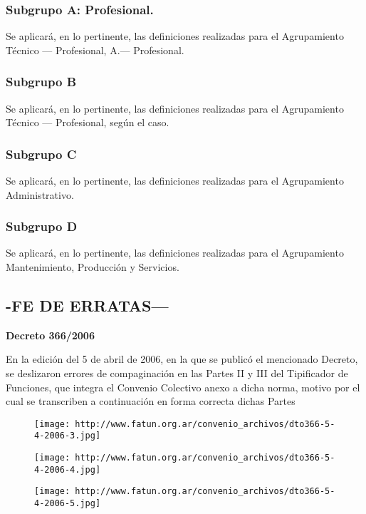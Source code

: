 \documentclass[]{article}
\begin{document}
\subsubsection{Subgrupo A: Profesional.}\label{subgrupo-a-profesional.}

Se aplicará, en lo pertinente, las definiciones realizadas para el
Agrupamiento Técnico --- Profesional, A.--- Profesional.

\subsubsection{Subgrupo B}\label{subgrupo-b}

Se aplicará, en lo pertinente, las definiciones realizadas para el
Agrupamiento Técnico --- Profesional, según el caso.

\subsubsection{Subgrupo C}\label{subgrupo-c}

Se aplicará, en lo pertinente, las definiciones realizadas para el
Agrupamiento Administrativo.

\subsubsection{Subgrupo D}\label{subgrupo-d}

Se aplicará, en lo pertinente, las definiciones realizadas para el
Agrupamiento Mantenimiento, Producción y Servicios.

\subsection{-FE DE ERRATAS---}\label{fe-de-erratas}

\textbf{Decreto 366/2006}

En la edición del 5 de abril de 2006, en la que se publicó el mencionado
Decreto, se deslizaron errores de compaginación en las Partes II y III
del Tipificador de Funciones, que integra el Convenio Colectivo anexo a
dicha norma, motivo por el cual se transcriben a continuación en forma
correcta dichas Partes

\begin{figure}[htbp]
\centering
\texttt{[image: http://www.fatun.org.ar/convenio\_archivos/dto366-5-4-2006-3.jpg]}
\caption{}
\end{figure}

\begin{figure}[htbp]
\centering
\texttt{[image: http://www.fatun.org.ar/convenio\_archivos/dto366-5-4-2006-4.jpg]}
\caption{}
\end{figure}

\begin{figure}[htbp]
\centering
\texttt{[image: http://www.fatun.org.ar/convenio\_archivos/dto366-5-4-2006-5.jpg]}
\caption{}
\end{figure}
\end{document}
